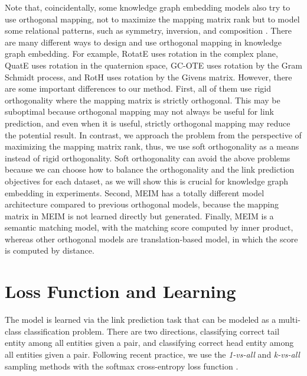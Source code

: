 \documentclass{article}
\theoremstyle{plain}
\theoremstyle{remark}
\begin{document}
Note that, coincidentally, some knowledge graph embedding models also try to use orthogonal mapping, not to maximize the mapping matrix rank but to model some relational patterns, such as symmetry, inversion, and composition \cite{sun_rotateknowledgegraph_2019}. There are many different ways to design and use orthogonal mapping in knowledge graph embedding. For example, RotatE \cite{sun_rotateknowledgegraph_2019} uses rotation in the complex plane, QuatE \cite{zhang_quaternionknowledgegraph_2019} uses rotation in the quaternion space, GC-OTE \cite{tang_orthogonalrelationtransforms_2020} uses rotation by the Gram Schmidt process, and RotH \cite{chami_lowdimensionalhyperbolicknowledge_2020} uses rotation by the Givens matrix. However, there are some important differences to our method. First, all of them use rigid orthogonality where the mapping matrix is strictly orthogonal. This may be suboptimal because orthogonal mapping may not always be useful for link prediction, and even when it is useful, strictly orthogonal mapping may reduce the potential result. In contrast, we approach the problem from the perspective of maximizing the mapping matrix rank, thus, we use soft orthogonality as a means instead of rigid orthogonality. Soft orthogonality can avoid the above problems because we can choose how to balance the orthogonality and the link prediction objectives for each dataset, as we will show this is crucial for knowledge graph embedding in experiments. Second, MEIM has a totally different model architecture compared to previous orthogonal models, because the mapping matrix in MEIM is not learned directly but generated. Finally, MEIM is a semantic matching model, with the matching score computed by inner product, whereas other orthogonal models are translation-based model, in which the score is computed by distance.




\section{Loss Function and Learning} \label{sect:learning} The model is learned via the link prediction task that can be modeled as a multi-class classification problem. There are two directions, classifying correct tail entity  among all entities given a  pair, and classifying correct head entity  among all entities given a  pair. Following recent practice, we use the \textit{1-vs-all} and \textit{k-vs-all} sampling methods with the softmax cross-entropy loss function \cite{dettmers_convolutional2dknowledge_2018} \cite{ruffinelli_youcanteach_2020}. 
\end{document}
